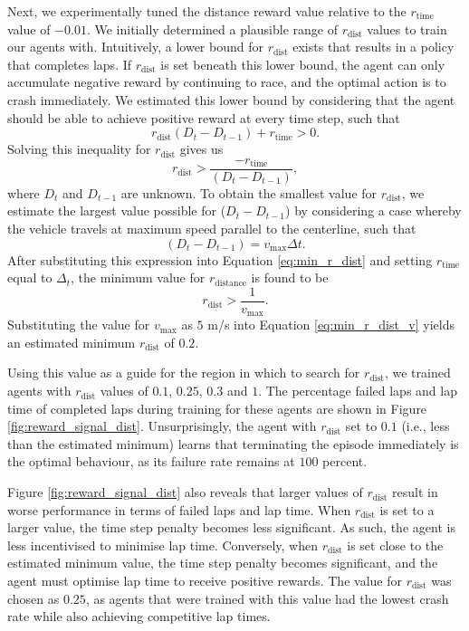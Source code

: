 Next, we experimentally tuned the distance reward value relative to the $r_{\text{time}}$ value of $-0.01$.
We initially determined a plausible range of $r_{\text{dist}}$ values to train our agents with.
Intuitively, a lower bound for $r_{\text{dist}}$ exists that results in a policy that completes laps.
If $r_{\text{dist}}$ is set beneath this lower bound, the agent can only accumulate negative reward by continuing to race, and the optimal action is to crash immediately.
We estimated this lower bound by considering that the agent should be able to achieve positive reward at every time step, such that
\begin{equation}
    r_{\text{dist}}(D_{t} - D_{t-1}) + r_{\text{time}} > 0.
\end{equation}
Solving this inequality for $r_{\text{dist}}$ gives us
\begin{equation}
    r_{\text{dist}} > \frac{-r_{\text{time}}}{(D_t-D_{t-1})},
\label{eq:min_r_dist}
\end{equation}
where $D_{t}$ and $D_{t-1}$ are unknown.
To obtain the smallest value for $r_{\text{dist}}$, we estimate the largest value possible for ($D_{t}-D_{t-1}$) by considering a case whereby the vehicle  travels at maximum speed parallel to the centerline, such that
\begin{equation}\label{eq:D_t}
    (D_t - D_{t-1}) = v_{\text{max}} \Delta t.
\end{equation}
After substituting this expression into Equation \ref{eq:min_r_dist} and setting $r_{\text{time}}$ equal to $\Delta_t$, the minimum value for $r_{\text{distance}}$ is found to be
\begin{equation}\label{eq:min_r_dist_v}
    r_{\text{dist}} > \frac{1}{v_{\text{max}}}.
\end{equation}
Substituting the value for $v_{\text{max}}$ as $5$ m/s into Equation \ref{eq:min_r_dist_v} yields an estimated minimum $r_{\text{dist}}$ of $0.2$.


Using this value as a guide for the region in which to search for  $r_{\text{dist}}$, we trained agents with $r_{\text{dist}}$ values of $0.1$, $0.25$, $0.3$ and $1$. 
The percentage failed laps and lap time of completed laps during training for these agents are shown in Figure \ref{fig:reward_signal_dist}.
Unsurprisingly, the agent with $r_{\text{dist}}$ set to $0.1$ (i.e., less than the estimated minimum) learns that terminating the episode immediately is the optimal behaviour, as its failure rate remains at $100$ percent.


Figure \ref{fig:reward_signal_dist} also reveals that larger values of $r_{\text{dist}}$ result in worse performance in terms of failed laps and lap time.
When $r_{\text{dist}}$ is set to a larger value, the time step penalty becomes less significant.
As such, the agent is less incentivised to minimise lap time.
Conversely, when $r_{\text{dist}}$ is set close to the estimated minimum value, the time step penalty becomes significant, and the agent must optimise lap time to receive positive rewards.
The value for $r_{\text{dist}}$ was chosen as $0.25$, as agents that were trained with this value had the lowest crash rate while also achieving competitive lap times.

